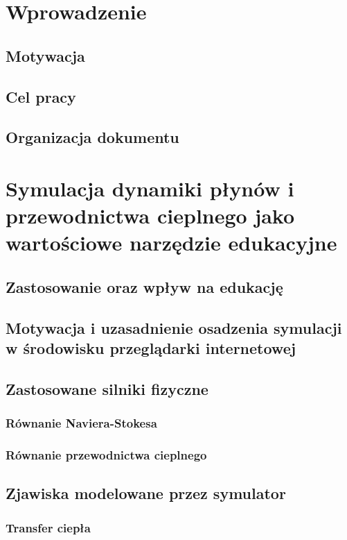 \documentclass[pdflatex,11pt]{aghdpl}
\author{Piotr Janik}
\date{2012}
\begin{document}
\titlepages



\tableofcontents
\clearpage

\chapter{Wprowadzenie}
	\section{Motywacja}
	\section{Cel pracy}
	\section{Organizacja dokumentu}
	
	
\chapter{Symulacja dynamiki płynów i przewodnictwa cieplnego jako wartościowe narzędzie edukacyjne}
	\section{Zastosowanie oraz wpływ na edukację}
	\section{Motywacja i uzasadnienie osadzenia symulacji w środowisku przeglądarki internetowej}
	\section{Zastosowane silniki fizyczne}
		\subsection{Równanie Naviera-Stokesa}
		\subsection{Równanie przewodnictwa cieplnego}
	\section{Zjawiska modelowane przez symulator}
		\subsection{Transfer ciepła}
\end{document}
